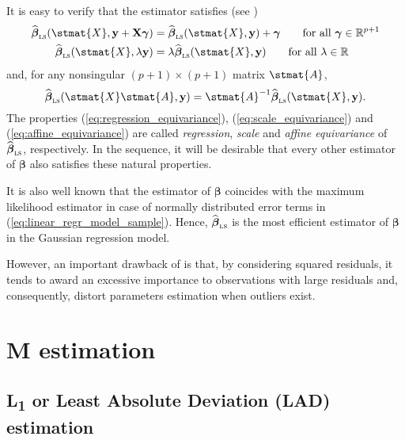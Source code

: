 It is easy to verify that the  estimator satisfies 
(see \citealp[92]{maronna:etal:2006})
%
\begin{align}
    \label{eq:regression_equivariance}
    \sthat{\boldsymbol\beta}_{\stsc{LS}}(\stmat{X},\stvec{y}+\mathbf{X}\boldsymbol\gamma) 
        &= \sthat{\boldsymbol\beta}_{\stsc{LS}}(\stmat{X},\stvec{y})+\boldsymbol\gamma
        \qquad\text{for all $\boldsymbol\gamma\in\mathbb{R}^{p+1}$} \\
    \label{eq:scale_equivariance}
    \sthat{\boldsymbol\beta}_{\stsc{LS}}(\stmat{X},\lambda\stvec{y})
        &= \lambda\sthat{\boldsymbol\beta}_{\stsc{LS}}(\stmat{X}, \stvec{y})
        \qquad\text{for all $\lambda\in\mathbb{R}$}
\end{align}
%
and, for any nonsingular $(p+1) \times (p+1)$ matrix $\stmat{A}$,
%
\begin{equation}\label{eq:affine_equivariance}
    \sthat{\boldsymbol\beta}_{\stsc{LS}}(\stmat{X}\stmat{A},\stvec{y})
    = \stmat{A}^{-1}\sthat{\boldsymbol\beta}_{\stsc{LS}}(\stmat{X},\stvec{y}).
\end{equation}
%
The properties (\ref{eq:regression_equivariance}),
(\ref{eq:scale_equivariance}) and (\ref{eq:affine_equivariance}) are called
\emph{regression}, \emph{scale} and \emph{affine equivariance} of
$\sthat{\boldsymbol\beta}_{\stsc{LS}}$, respectively. In the sequence, it will
be desirable that every other estimator of $\boldsymbol\beta$ also satisfies
these natural properties.

It is also well known that the  estimator of $\boldsymbol\beta$ coincides
with the maximum likelihood estimator in case of normally distributed error
terms in (\ref{eq:linear_regr_model_sample}). Hence, $\widehat
{\boldsymbol\beta}_{\stsc{LS}}$ is the most efficient estimator of
$\boldsymbol\beta$ in the Gaussian regression model.

However, an important drawback of  is that, by considering squared
residuals, it tends to award an excessive importance to observations with large
residuals and, consequently, distort parameters estimation when outliers exist.

\section{M estimation}

\subsection{L\textsubscript{1} or Least Absolute Deviation (LAD) estimation}

